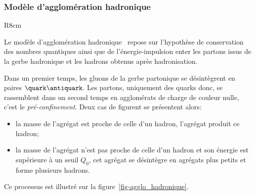 \subsubsection{Modèle d'agglomération hadronique}\label{chapter-JERC-section-jets-subsec-hadronisation-subsubsec-agglo_hadronique}
\begin{wrapfigure}{R}{8cm}
\centering

\caption{Schématisation de l'hadronisation dans le cadre du modèle d'agglomération hadronique.}
\label{fig-agglo_hadronique}
\end{wrapfigure}
Le modèle d'agglomération hadronique~\cite{Winter_2004} repose sur l'hypothèse de conservation des nombres quantiques ainsi que de l'énergie-impulsion enter les partons issus de la gerbe hadronique et les hadrons obtenus après hadronisation.
\par Dans un premier temps, les gluons de la gerbe partonique se désintègrent en paires $\quark\antiquark$. Les partons, uniquement des quarks donc, se rassemblent dans un second temps en agglomérats de charge de couleur nulle, c'est le \emph{pré-confinement}.
Deux cas de figurent se présentent alors:
\begin{itemize}
\item la masse de l'agrégat est proche de celle d'un hadron, l'agrégat produit ce hadron;
\item la masse de l'agrégat n'est pas proche de celle d'un hadron et son énergie est supérieure à un seuil $Q_0$, cet agrégat se désintègre en agrégats plus petits et forme plusieurs hadrons.
\end{itemize}
Ce processus est illustré sur la figure~\ref{fig-agglo_hadronique}.
